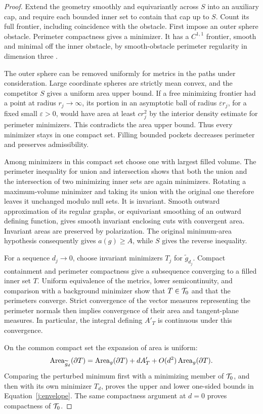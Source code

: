 \begin{proof}
Extend the geometry smoothly and equivariantly across \(S\) into an
auxiliary cap, and require each bounded inner set to contain that cap up
to \(S\). Count its full frontier, including coincidence with the obstacle.
First impose an outer sphere obstacle. Perimeter compactness gives a
minimizer. It has a \(C^{1,1}\) frontier, smooth and minimal off the inner
obstacle, by smooth-obstacle perimeter regularity in dimension three
\cite[Regularity Theorem~1.3(iii)]{HuiskenIlmanen2001}.

The outer sphere can be removed uniformly for metrics in the paths under
consideration. Large coordinate spheres are strictly mean convex, and the
competitor \(S\) gives a uniform area upper bound. If a free minimizing
frontier had a point at radius \(r_j\to\infty\), its portion in an
asymptotic ball of radius \(\varepsilon r_j\), for a fixed small
\(\varepsilon>0\), would have area at least \(c r_j^2\) by the interior
density estimate for perimeter minimizers. This contradicts the area upper
bound. Thus every minimizer stays in one compact set. Filling bounded
pockets decreases perimeter and preserves admissibility.

Among minimizers in this compact set choose one with largest filled
volume. The perimeter inequality for union and intersection shows that
both the union and the intersection of two minimizing inner sets are
again minimizers. Rotating a maximum-volume minimizer and taking its
union with the original one therefore leaves it unchanged modulo null
sets. It is invariant. Smooth outward approximation of its regular
graphs, or equivariant smoothing of an outward defining function, gives
smooth invariant enclosing cuts with convergent area. Invariant areas are
preserved by polarization. The original minimum-area hypothesis consequently
gives \(a(g)\geq A\), while \(S\) gives the reverse inequality.

For a sequence \(d_j\to0\), choose invariant minimizers \(T_j\) for
\(\widetilde g_{d_j}\). Compact containment and perimeter compactness give
a subsequence converging to a filled inner set \(T\). Uniform equivalence
of the metrics, lower semicontinuity, and comparison with a background
minimizer show that \(T\in\mathcal T_0\) and that the perimeters converge.
Strict convergence of the vector measures representing the perimeter
normals then implies convergence of their area and tangent-plane
measures. In particular, the integral defining \(A'_T\) is continuous
under this convergence.

On the common compact set the expansion of area is uniform:
\[
 \operatorname{Area}_{\widetilde g_d}(\partial T)
 =\operatorname{Area}_g(\partial T)+dA'_T+O(d^2)\operatorname{Area}_g(\partial T).
\]
Comparing the perturbed minimum first with a minimizing member of
\(\mathcal T_0\), and then with its own minimizer \(T_d\), proves the upper and
lower one-sided bounds in Equation~\eqref{j:envelope}. The same compactness
argument at \(d=0\) proves compactness of \(\mathcal T_0\).
\end{proof}

